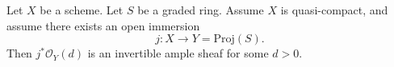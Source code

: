 \begin{lemma}
\label{lemma-open-in-proj-ample}
Let $X$ be a scheme.
Let $S$ be a graded ring. Assume $X$ is quasi-compact,
and assume there exists an open immersion
$$
j : X \longrightarrow Y = \text{Proj}(S).
$$
Then $j^*\mathcal{O}_Y(d)$ is an invertible ample sheaf
for some $d > 0$.
\end{lemma}